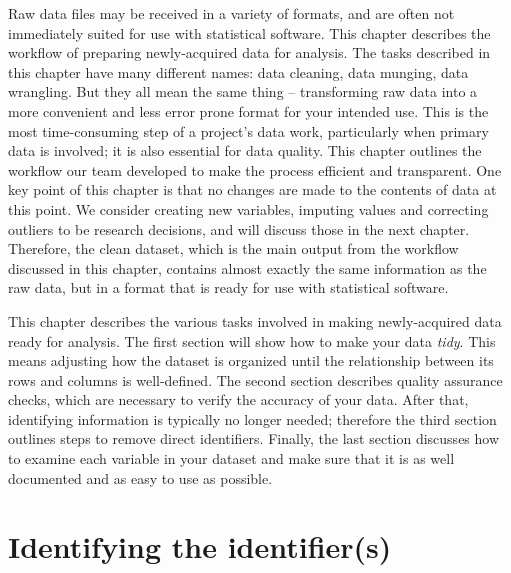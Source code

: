 
\begin{fullwidth}

Raw data files may be received in a variety of formats, 
and are often not immediately suited for use with statistical software.
This chapter describes the workflow of preparing newly-acquired data for analysis.
The tasks described in this chapter have many different names:
data cleaning, data munging, data wrangling.
But they all mean the same thing --
transforming raw data into a more convenient and less error prone format for your intended use.
This is the most time-consuming step of a project's data work, 
particularly when primary data is involved;
it is also essential for data quality. 
This chapter outlines the workflow our team developed to make the process efficient and transparent.
One key point of this chapter is that no changes are made to the contents of data at this point.
We consider creating new variables, imputing values and correcting outliers
to be research decisions, and will discuss those in the next chapter. 
Therefore, the clean dataset,
which is the main output from the workflow discussed in this chapter,
contains almost exactly the same information as the raw data,
but in a format that is ready for use with statistical software. 

This chapter describes the various tasks involved in making newly-acquired data ready for analysis.
The first section will show how to make your data \textit{tidy}.
This means adjusting how the dataset is organized 
until the relationship between its rows and columns is well-defined.
The second section describes quality assurance checks, 
which are necessary to verify the accuracy of your data.
After that, identifying information is typically no longer needed;
therefore the third section outlines steps to remove direct identifiers.
Finally, the last section discusses how to examine each variable in your dataset and 
make sure that it is as well documented and as easy to use as possible.

\end{fullwidth}



\section{Identifying the identifier(s)}

